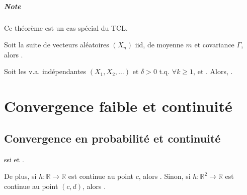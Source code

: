 \documentclass[10pt, french]{report}
\begin{document}
\begin{multicols*}{2}
\begin{definitionNOHFILLsub}
\paragraph{Note}	Ce théorème est un cas spécial du TCL.
\end{definitionNOHFILLsub}

\begin{definitionNOHFILL}
Soit la suite de vecteurs aléatoires $(X_{n})$ iid, de moyenne $m$ et covariance $\Gamma$, alors .
\end{definitionNOHFILL}

\begin{definitionNOHFILL}
Soit les v.a. indépendantes $(X_{1}, X_{2}, \dots)$ et $\delta > 0$ t.q. $\forall k \geq 1$, et . Alors, .
\end{definitionNOHFILL}




\newpage
\chapter{Convergence faible et continuité}
\section{Convergence en probabilité et continuité}
\begin{definitionNOHFILL}[Proposition]
 ssi  et .

\bigskip

De plus, si $h: \mathbb{R} \rightarrow \mathbb{R}$ est continue au point $c$, alors . Sinon, si $h: \mathbb{R}^{2} \rightarrow \mathbb{R}$ est continue au point $(c, d)$, alors .


\end{definitionNOHFILL}
\end{multicols*}
\end{document}
